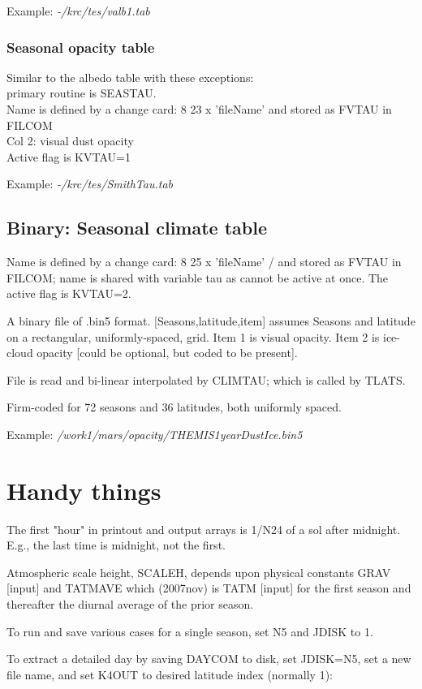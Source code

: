 \documentclass{article}
\newcommand{\qi}{\\ \hspace*{2.em}}      %
\newcommand{\nf}{\textit}  %
\begin{document}
Example: \nf{-/krc/tes/valb1.tab}

\subsubsection{Seasonal opacity table}
Similar to the albedo table with these exceptions:
\qi primary routine is SEASTAU.
\qi Name is defined by a change card:  8 23 x 'fileName' and stored as FVTAU in FILCOM
\qi Col 2: visual dust opacity
\qi Active flag is KVTAU=1

Example: \nf{-/krc/tes/SmithTau.tab} 

\subsection{Binary: Seasonal climate table}
Name is defined by a change card: 8 25 x 'fileName' / and stored as FVTAU in
FILCOM; name is shared with variable tau as cannot be active at once. The active
flag is KVTAU=2.

A binary file of .bin5 format. [Seasons,latitude,item] assumes Seasons and
latitude on a rectangular, uniformly-spaced, grid. Item 1 is visual opacity.
Item 2 is ice-cloud opacity [could be optional, but coded to be present].

File is read and bi-linear interpolated by CLIMTAU; which is called by TLATS. 
  
Firm-coded for 72 seasons and 36 latitudes, both uniformly spaced. 

Example: \nf{/work1/mars/opacity/THEMIS1yearDustIce.bin5}

\section{Handy things} %

The first "hour" in printout and output arrays is  1/N24 of a
sol after midnight. E.g., the last time is midnight, not the first.

Atmospheric scale height, SCALEH, depends upon physical constants GRAV [input] 
and TATMAVE which (2007nov) is TATM [input] for the first season and 
thereafter the diurnal average of the prior season. 
 
To run and save various cases for a single season, set N5 and JDISK to 1.

To extract a detailed day by saving DAYCOM to disk, set JDISK=N5, set a new
file name, and set K4OUT to desired latitude index (normally 1):
\end{document}
